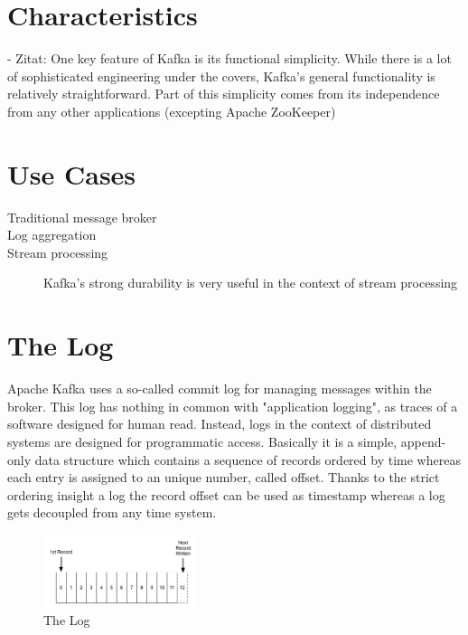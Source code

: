 \section{Characteristics}
- Zitat: One key feature of Kafka is its functional simplicity. While there is a
lot of sophisticated engineering under the covers, Kafka’s general functionality
is relatively straightforward. Part of this simplicity comes from its
independence from any other applications (excepting Apache ZooKeeper)

\section{Use Cases}
\begin{description}
    \item [Traditional message broker]
    \item [Log aggregation]
    \item [Stream processing] Kafka's strong durability is very useful in the
        context of stream processing
\end{description}

\section{The Log}
Apache Kafka uses a so-called commit log for managing messages within the
broker. This log has nothing in common with "application logging", as traces of
a software designed for human read. Instead, logs in the context of distributed systems
are designed for programmatic access. Basically it is a simple, append-only data
structure which contains a sequence of records ordered by time whereas each
entry is assigned to an unique number, called offset. Thanks to the strict
ordering insight a log the record offset can be used as timestamp whereas a log
gets decoupled from any time system. \cite{apachekafka} \cite{JK-TheLog}

\begin{figure}[H]
    \centering
    \includegraphics[width=0.4\textwidth]{images/log.png}
    \caption{The  Log \cite{JK-TheLog}}
    \label{fig:the-log}
\end{figure}

